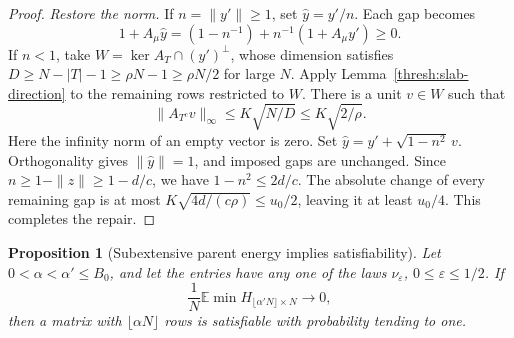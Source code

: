 \documentclass[11pt,a4paper]{article}
\numberwithin{equation}{section}
\newtheorem{proposition}[theorem]{Proposition}
\theoremstyle{definition}
\theoremstyle{remark}
\newcommand{\E}{\mathbb E}
\newcommand{\eps}{\varepsilon}
\begin{document}
\begin{proof}
\emph{Restore the norm.}
If $n=\|y'\|\geq1$, set $\widehat y=y'/n$.  Each gap becomes
\[
 1+A_\mu\widehat y=(1-n^{-1})+n^{-1}(1+A_\mu y')\geq0.
\]
If $n<1$, take
$W=\ker A_T\cap(y')^\perp$, whose dimension satisfies
$D\geq N-|T|-1\geq\rho N-1\geq\rho N/2$ for large $N$.
Apply Lemma~\ref{thresh:slab-direction} to the remaining rows restricted
to $W$.  There is a unit $v\in W$ such that
\[
 \|A_{T^c}v\|_\infty\leq K\sqrt{N/D}
                      \leq K\sqrt{2/\rho}.
\]
Here the infinity norm of an empty vector is zero.  Set
$\widehat y=y'+\sqrt{1-n^2}\,v$.
Orthogonality gives $\|\widehat y\|=1$, and imposed gaps are unchanged.
Since $n\geq1-\|z\|\geq1-d/c$, we have
$1-n^2\leq2d/c$.  The absolute change of every remaining gap is at most
$K\sqrt{4d/(c\rho)}\leq u_0/2$, leaving it at least $u_0/4$.
This completes the repair.
\end{proof}

\begin{proposition}[Subextensive parent energy implies satisfiability]
\label{thresh:deletion}
Let $0<\alpha<\alpha'\leq B_0$, and let the entries have any one of the
laws $\nu_\eps$, $0\leq\eps\leq1/2$.  If
\[
 \frac1N\E\min H_{\lfloor\alpha'N\rfloor\times N}\longrightarrow0,
\]
then a matrix with $\lfloor\alpha N\rfloor$ rows is satisfiable with
probability tending to one.
\end{proposition}
\end{document}
